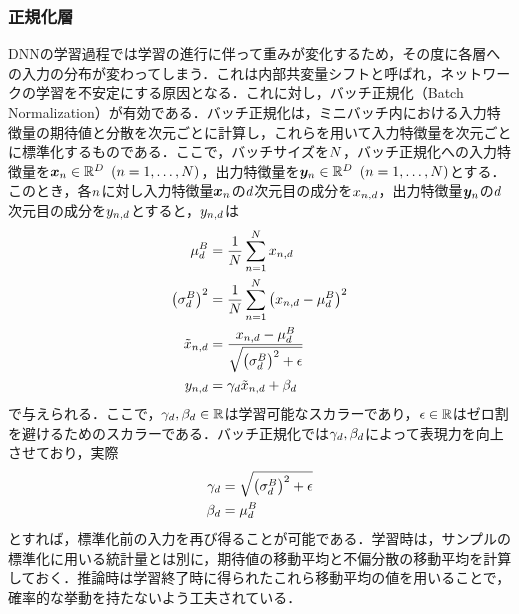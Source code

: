 \documentclass[12pt]{jarticle}
\numberwithin{equation}{section}    %
\numberwithin{figure}{section}      %
\numberwithin{table}{section}      %
\begin{document}
\subsubsection{正規化層}
DNNの学習過程では学習の進行に伴って重みが変化するため，その度に各層への入力の分布が変わってしまう．これは内部共変量シフトと呼ばれ，ネットワークの学習を不安定にする原因となる．これに対し，バッチ正規化（Batch Normalization）\cite{ioffe2015batch}が有効である．バッチ正規化は，ミニバッチ内における入力特徴量の期待値と分散を次元ごとに計算し，これらを用いて入力特徴量を次元ごとに標準化するものである．ここで，バッチサイズを$N$，バッチ正規化への入力特徴量を$\bm{x}_{n} \in \mathbb{R}^{D} ~ \left(n = 1, \ldots, N\right)$，出力特徴量を$\bm{y}_{n} \in \mathbb{R}^{D} ~ \left(n = 1, \ldots, N\right)$とする．このとき，各$n$に対し入力特徴量$\bm{x}_{n}$の$d$次元目の成分を$x_{n, d}$，出力特徴量$\bm{y}_{n}$の$d$次元目の成分を$y_{n, d}$とすると，$y_{n, d}$は
\begin{align}
    \mu^{B}_{d}                      & = \frac{1}{N} \sum_{n = 1}^{N} x_{n, d}                                  \\
    \left(\sigma^{B}_{d}\right)^{2}              & = \frac{1}{N} \sum_{n = 1}^{N} \left(x_{n, d} - \mu^{B}_{d}\right)^{2} \\
    \tilde{x}_{n, d} & = \frac{x_{n, d} - \mu^{B}_{d}}{\sqrt{\left(\sigma^{B}_{d}\right)^{2} + \epsilon}}       \\
    y_{n, d}        & = \gamma_{d} \tilde{x}_{n, d} +  \beta_{d}
\end{align}
で与えられる．ここで，$\gamma_{d}, \beta_{d} \in \mathbb{R}$は学習可能なスカラーであり，$\epsilon \in \mathbb{R}$はゼロ割を避けるためのスカラーである．バッチ正規化では$\gamma_{d}, \beta_{d}$によって表現力を向上させており，実際
\begin{align}
    \gamma_{d} & = \sqrt{\left(\sigma^{B}_{d}\right)^{2} + \epsilon} \\
    \beta_{d}      & = \mu^{B}_{d}
\end{align}
とすれば，標準化前の入力を再び得ることが可能である．学習時は，サンプルの標準化に用いる統計量とは別に，期待値の移動平均と不偏分散の移動平均を計算しておく．推論時は学習終了時に得られたこれら移動平均の値を用いることで，確率的な挙動を持たないよう工夫されている．
\end{document}
